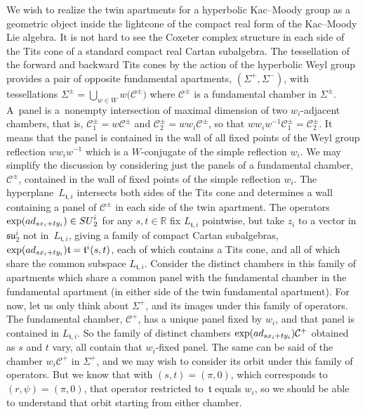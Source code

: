 \documentclass[11pt]{article}
\numberwithin{equation}{section}
\numberwithin{equation}{section}
\def\R{\mathbb{R}}
\def\cC{\mathcal C}
\def\ft{\mathfrak{t}}
\def\fsu{\mathfrak{su}}
\begin{document}
We wish to realize the twin apartments for a hyperbolic Kac--Moody group as a geometric object inside the lightcone of the compact real form of the Kac--Moody Lie algebra. It is not hard to see the Coxeter complex structure
in each side of the Tits cone of a standard compact real Cartan subalgebra. The tessellation of the forward and backward Tits cones by the action of the hyperbolic Weyl group provides a pair of opposite fundamental apartments, $(\Sigma^+,\Sigma^-)$, with tessellations $\Sigma^\pm = \bigcup\limits_{w\in W} w\big(\cC^\pm\big)$ where $\cC^\pm$ is a fundamental chamber in $\Sigma^\pm$. A~panel is a~nonempty intersection of maximal dimension of two $w_i$-adjacent chambers, that is, $\cC_1^\pm = w\cC^\pm$ and $\cC_2^\pm = w w_i \cC^\pm$, so that $w w_i w^{-1} \cC_1^\pm = \cC_2^\pm$. It means that the panel is contained in the wall of all fixed points of the Weyl group reflection $w w_i w^{-1}$ which is a $W$-conjugate of the simple reflection $w_i$. We may simplify the discussion by considering just the panels of a fundamental chamber, $\cC^\pm$, contained in the wall of fixed points of the simple reflection $w_i$. The hyperplane~$L_{\ft,i}$ intersects both sides of the Tits cone and determines a wall containing a panel of $\cC^\pm$ in each side of the twin apartment. The operators $\exp( {\rm ad}_{sx_i+ty_i})\in {\rm SU}_2^i$ for any $s,t\in\R$ fix $L_{\ft,i}$ pointwise, but take $z_i$ to a vector in $\fsu_2^i$ not in~$L_{\ft,i}$, giving a family of compact Cartan
subalgebras, $\exp( {\rm ad}_{sx_i+ty_i}) \ft = \ft^i(s,t)$, each of which contains a Tits cone, and all of which share the common subspace $L_{\ft,i}$. Consider the distinct chambers in this family of apartments which share a common panel with the fundamental chamber in the fundamental apartment (in either side of the twin fundamental apartment). For now, let us only think about $\Sigma^+$, and its images under this family of operators. The fundamental chamber, $\cC^+$, has a unique panel fixed by $w_i$, and that panel is contained in $L_{\ft,i}$. So the family of distinct chambers $\exp( {\rm ad}_{sx_i+ty_i}) \cC^+$ obtained as $s$ and $t$ vary, all contain that $w_i$-fixed panel. The same can be said of the chamber $w_i \cC^+$ in $\Sigma^+$, and we may wish to consider its orbit under this family of operators. But we know that with $(s,t) = (\pi,0)$, which corresponds to $(r,\psi) = (\pi, 0)$, that operator restricted to~$\ft$
equals $w_i$, so we should be able to understand that orbit starting from either chamber.
\end{document}
